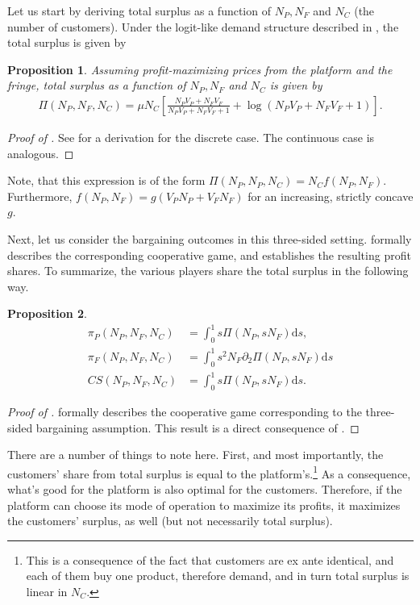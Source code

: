 \documentclass[a4paper]{article}
\newtheorem{proposition}{Proposition}
\newcommand{\ds}{\mathrm{d}s}
\begin{document}
Let us start by deriving total surplus as a function of $N_P, N_F$ and $N_C$ (the number of customers).
Under the logit-like demand structure described in , the total surplus is given by
\begin{proposition}
    \label{prop:profits_total_surplus}
    Assuming profit-maximizing prices from the platform and the fringe, total surplus as a function of $N_P, N_F$ and $N_C$ is given by
    \begin{align*}
        \Pi(N_P, N_F, N_C) = \mu N_C \left[ \frac{N_P V_P + N_F V_F}{N_P V_P + N_F V_F + 1} + \log(N_P V_P + N_F V_F + 1) \right].
    \end{align*}
\end{proposition}
\begin{proof}[Proof of ]
    See \textcite{small1981applied} for a derivation for the discrete case.
    The continuous case is analogous.
\end{proof}
Note, that this expression is of the form $\Pi(N_P, N_P, N_C) = N_C f(N_P, N_F)$.
Furthermore, $f(N_P, N_F) = g(V_P N_P + V_F N_F)$ for an increasing, strictly concave $g$.

Next, let us consider the bargaining outcomes in this three-sided setting.
 formally describes the corresponding cooperative game, and  establishes the resulting profit shares.
To summarize, the various players share the total surplus in the following way.
\begin{proposition}
    \label{prop:three_way_shapley_value}
    \begin{align*}
        \pi_P(N_P, N_F, N_C) &= \int_0^1 s \Pi(N_P, s N_F) \ds, \\
        \pi_F(N_P, N_F, N_C) &= \int_0^1 s^2 N_F \partial_2 \Pi(N_P, s N_F) \ds \\
        CS(N_P, N_F, N_C) &= \int_0^1 s \Pi(N_P, s N_F) \ds.
    \end{align*}
\end{proposition}
\begin{proof}[Proof of ]
     formally describes the cooperative game corresponding to the three-sided bargaining assumption.
    This result is a direct consequence of .
\end{proof}

There are a number of things to note here.
First, and most importantly, the customers' share from total surplus is equal to the platform's.\footnote{
    This is a consequence of the fact that customers are ex ante identical, and each of them buy one product, therefore demand, and in turn total surplus is linear in $N_C$.
}
As a consequence, what's good for the platform is also optimal for the customers.
Therefore, if the platform can choose its mode of operation to maximize its profits, it maximizes the customers' surplus, as well (but not necessarily total surplus).
\end{document}
